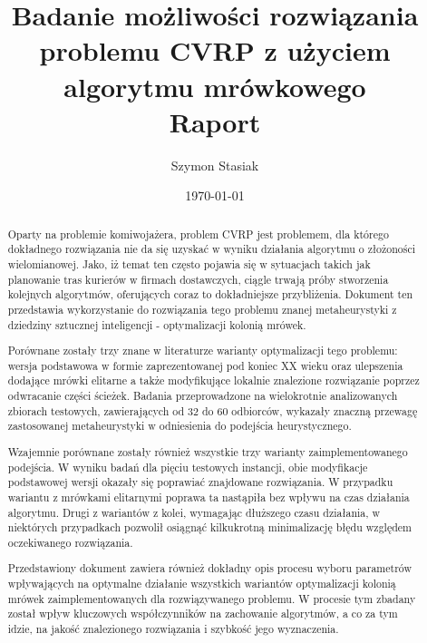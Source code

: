 \documentclass[10pt]{article}
\title{Badanie możliwości rozwiązania problemu CVRP z użyciem algorytmu mrówkowego\\
\large{Raport}}
\author{Szymon Stasiak}
\date{\today}
\begin{document}
\maketitle
\begin{abstract}
Oparty na problemie komiwojażera, problem CVRP jest problemem, dla którego dokładnego rozwiązania nie da się uzyskać w wyniku działania algorytmu o złożoności wielomianowej. Jako, iż temat ten często pojawia się w sytuacjach takich jak planowanie tras kurierów w firmach dostawczych, ciągle trwają próby stworzenia kolejnych algorytmów, oferujących coraz to dokładniejsze przybliżenia. Dokument ten przedstawia wykorzystanie do rozwiązania tego problemu znanej metaheurystyki z dziedziny sztucznej inteligencji - optymalizacji kolonią mrówek.

Porównane zostały trzy znane w literaturze warianty optymalizacji tego problemu: wersja podstawowa w formie zaprezentowanej pod koniec XX wieku oraz ulepszenia dodające mrówki elitarne a także modyfikujące lokalnie znalezione rozwiązanie poprzez odwracanie części ścieżek. Badania przeprowadzone na wielokrotnie analizowanych zbiorach testowych, zawierających od 32 do 60 odbiorców, wykazały znaczną przewagę zastosowanej metaheurystyki w odniesienia do podejścia heurystycznego.

Wzajemnie porównane zostały również wszystkie trzy warianty zaimplementowanego podejścia. W wyniku badań dla pięciu testowych instancji, obie modyfikacje podstawowej wersji okazały się poprawiać znajdowane rozwiązania. W przypadku wariantu z mrówkami elitarnymi poprawa ta nastąpiła bez wpływu na czas działania algorytmu. Drugi z wariantów z kolei, wymagając dłuższego czasu działania, w niektórych przypadkach pozwolił osiągnąć kilkukrotną minimalizację błędu względem oczekiwanego rozwiązania.

Przedstawiony dokument zawiera również dokładny opis procesu wyboru parametrów wpływających na optymalne działanie wszystkich wariantów optymalizacji kolonią mrówek zaimplementowanych dla rozwiązywanego problemu. W procesie tym zbadany został wpływ kluczowych współczynników na zachowanie algorytmów, a co za tym idzie, na jakość znalezionego rozwiązania i szybkość jego wyznaczenia.
\end{abstract}

\newpage
\tableofcontents
\newpage
\end{document}
